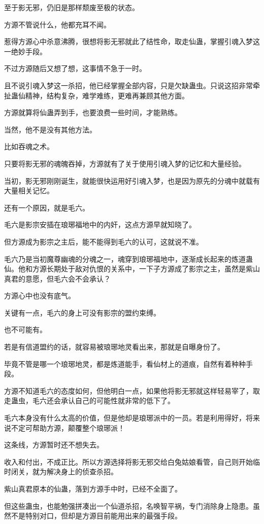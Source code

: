 \begin{this_body}
至于影无邪，仍旧是那样颓废至极的状态。

方源不管说什么，他都充耳不闻。

惹得方源心中杀意沸腾，很想将影无邪就此了结性命，取走仙蛊，掌握引魂入梦这一绝妙手段。

不过方源随后又想了想，这事情不急于一时。

且不说引魂入梦这一杀招，他已经掌握全部内容，只是欠缺蛊虫。只说这招非常牵扯蛊仙精神，结构复杂，难学难练，更难再兼顾其他方面。

方源就算将仙蛊弄到手，也要浪费一些时间，才能熟练。

当然，他不是没有其他方法。

比如吞魂之术。

只要将影无邪的魂魄吞掉，方源就有了关于使用引魂入梦的记忆和大量经验。

当初，影无邪刚刚诞生，就能很快运用好引魂入梦，也是因为原先的分魂中就载有大量相关记忆。

还有一个原因，就是毛六。

毛六是影宗安插在琅琊福地中的内奸，这点方源早就知晓了。

但方源成为影宗之主后，能不能得到毛六的认可，这就说不准。

毛六乃是当初魔尊幽魂的分魂之一，魂穿到琅琊福地中，逐渐成长起来的炼道蛊仙。他和方源长期处于敌对仇恨的关系中，一下子方源成了影宗之主，虽然是紫山真君的意愿，但毛六会不会承认？

方源心中也没有底气。

关键有一点，毛六的身上可没有影宗的盟约束缚。

也不可能有。

若是有信道盟约的话，就容易被琅琊地灵看出来，那就是自曝身份了。

毕竟不管是哪一个琅琊地灵，都是炼道能手，看仙材上的道痕，自然有着种种手段。

方源不知道毛六的态度如何，但他明白一点，如果他将影无邪就这样轻易宰了，取走蛊虫，毛六还会承认自己的可能性就非常的低下了。

毛六本身没有什么太高的价值，但是他却是琅琊派中的一员。若是利用得好，将来说不定可帮助方源，颠覆整个琅琊派！

这条线，方源暂时还不想失去。

收入和付出，不成正比。所以方源选择将影无邪交给白兔姑娘看管，自己则开始临时闭关，就为解决身上的侦查杀招。

紫山真君原本的仙蛊，落到方源手中时，已经不全面了。

但这些蛊虫，也能勉强拼凑出一个仙道杀招，名唤智平祸，专门消除身上隐患。虽然不是特别对口，但却是方源目前能用出来的最强手段。


\end{this_body}
